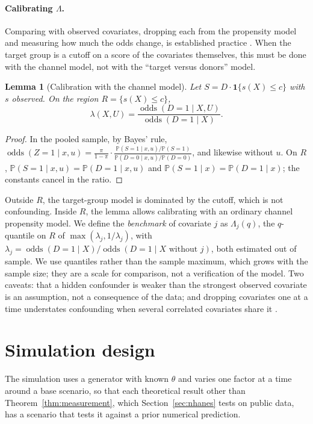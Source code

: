 \documentclass[11pt,a4paper]{article}
\newcommand{\PP}{\mathbb{P}}
\newcommand{\ind}{\mathbf{1}}
\newcommand{\odds}{\operatorname{odds}}
\theoremstyle{plain}
\newtheorem{lemma}{Lemma}
\theoremstyle{definition}
\begin{document}
\paragraph{Calibrating $\Lambda$.} Comparing with observed covariates, dropping each from the propensity model and measuring how much the odds change, is established practice \citep{mcclean2024,baitairian2025}. When the target group is a cutoff on a score of the covariates themselves, this must be done with the channel model, not with the ``target versus donors'' model.

\begin{lemma}[Calibration with the channel model]\label{lem:calibration}
Let $S=D\cdot\ind\{s(X)\le c\}$ with $s$ observed. On the region $R=\{s(X)\le c\}$,
\[
\lambda(X,U)=\frac{\odds(D=1\mid X,U)}{\odds(D=1\mid X)}.
\]
\end{lemma}
\begin{proof}
In the pooled sample, by Bayes' rule, $\odds(Z=1\mid x,u)=\frac{\pi}{1-\pi}\cdot\frac{\PP(S=1\mid x,u)/\PP(S=1)}{\PP(D=0\mid x,u)/\PP(D=0)}$, and likewise without $u$. On $R$, $\PP(S=1\mid x,u)=\PP(D=1\mid x,u)$ and $\PP(S=1\mid x)=\PP(D=1\mid x)$; the constants cancel in the ratio.
\end{proof}

Outside $R$, the target-group model is dominated by the cutoff, which is not confounding. Inside $R$, the lemma allows calibrating with an ordinary channel propensity model. We define the \emph{benchmark} of covariate $j$ as $\Lambda_j(q)$, the $q$-quantile on $R$ of $\max(\lambda_j,1/\lambda_j)$, with $\lambda_j=\odds(D=1\mid X)/\odds(D=1\mid X\text{ without }j)$, both estimated out of sample. We use quantiles rather than the sample maximum, which grows with the sample size; they are a scale for comparison, not a verification of the model. Two caveats: that a hidden confounder is weaker than the strongest observed covariate is an assumption, not a consequence of the data; and dropping covariates one at a time understates confounding when several correlated covariates share it \citep{mcclean2024}.
\section{Simulation design}\label{sec:design}

The simulation uses a generator with known $\theta$ and varies one factor at a time around a base scenario, so that each theoretical result other than Theorem~\ref{thm:measurement}, which Section~\ref{sec:nhanes} tests on public data, has a scenario that tests it against a prior numerical prediction.
\end{document}
